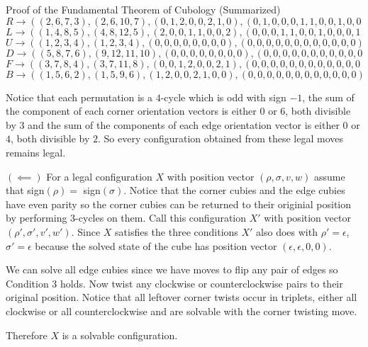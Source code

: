 \documentclass[final]{beamer}
\newlength{\colwidth}
\begin{document}
\begin{frame}[t]
\begin{columns}[t]
\begin{column}{\colwidth}
\begin{block}{Proof of the Fundamental Theorem of Cubology (Summarized)}
$$R \rightarrow ((2,6,7,3),(2,6,10,7),(0,1,2,0,0,2,1,0),(0,1,0,0,0,1,1,0,0,1,0,0))$$
$$L \rightarrow ((1 ,4,8,5),(4,8,12,5),(2, 0, 0, 1, 1, 0, 0, 2), (0, 0, 0, 1, 1, 0, 0, 1, 0, 0, 0, 1))$$
$$U \rightarrow ((1, 2, 3, 4), (1, 2, 3, 4), (0, 0, 0, 0, 0, 0, 0, 0), (0, 0, 0, 0, 0, 0, 0, 0, 0, 0, 0, 0))$$
$$D \rightarrow ((5, 8, 7, 6), (9, 12, 11, 10), (0, 0, 0, 0, 0, 0, 0, 0), (0, 0, 0, 0, 0, 0, 0, 0, 0, 0, 0, 0))$$
$$F \rightarrow ((3, 7, 8, 4), (3, 7, 11, 8), (0, 0, 1, 2, 0, 0, 2, 1), (0, 0, 0, 0, 0, 0, 0, 0, 0, 0, 0, 0))$$
$$B \rightarrow ((1, 5, 6, 2), (1, 5, 9, 6), (1, 2, 0, 0, 2, 1, 0, 0), (0, 0, 0, 0, 0, 0, 0, 0, 0, 0, 0, 0))$$

Notice that each permutation is a $4$-cycle which is odd with sign $-1$, the sum of the component of each corner orientation vectors is either $0$ or $6$, both divisible by $3$ and 
the sum of the components of each edge orientation vector is either $0$ or $4$, both divisible by $2$.
So every configuration obtained from these legal moves remains legal.

$(\impliedby)$ 
For a legal configuration $X$ with position vector $(\rho, \sigma, v, w)$ assume that sign$(\rho)=$ sign$(\sigma)$.
Notice that the corner cubies and the edge cubies have even parity so the corner cubies can be returned to their originial position by performing $3$-cycles on them. 
Call this configuration $X'$ with position vector $(\rho', \sigma', v', w')$.
Since $X$ satisfies the three conditions $X'$ also does with $\rho' = \epsilon$, $\sigma' = \epsilon$ because the solved state of the cube has position vector $(\epsilon, \epsilon, 0 , 0)$.

We can solve all edge cubies since we have moves to flip any pair of edges so Condition $3$ holds.
Now twist any clockwise or counterclockwise pairs to their original position.
Notice that all leftover corner twists occur in triplets, either all clockwise or all counterclockwise and are solvable with the corner twisting move.

Therefore $X$ is a solvable configuration.

  \end{block}




\end{column}
\end{columns}
\end{frame}
\end{document}
